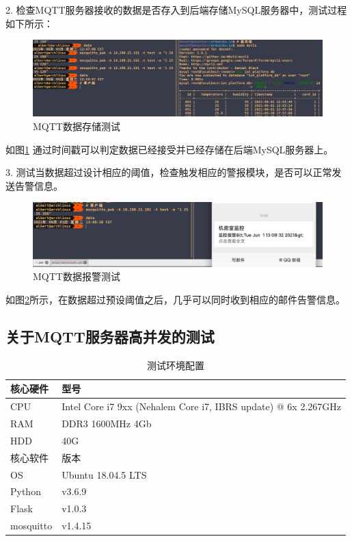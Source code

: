 2. 检查MQTT服务器接收的数据是否存入到后端存储MySQL服务器中，测试过程如下所示：
\begin{figure}[htbp]
	\centering
	\includegraphics[width=0.85\linewidth]{figure/test-2}
	\caption{MQTT数据存储测试}
	\label{fig:6-2}
\end{figure}
如图\ref{fig:6-2} 通过时间戳可以判定数据已经接受并已经存储在后端MySQL服务器上。

3. 测试当数据超过设计相应的阈值，检查触发相应的警报模块，是否可以正常发送告警信息。
\begin{figure}[htbp]
	\centering
	\includegraphics[width=0.85\linewidth]{figure/test-3}
	\caption{MQTT数据报警测试}
	\label{fig:6-3}
\end{figure}
如图\ref{fig:6-3}所示，在数据超过预设阈值之后，几乎可以同时收到相应的邮件告警信息。

\subsection{关于MQTT服务器高并发的测试}

\begin{table}[H]
	\centering
	\caption{测试环境配置}  %
	\begin{tabular}{ll} 
		\hline
		\hline
		核心硬件 & 型号 \\ 
		\hline
		CPU	& Intel Core i7 9xx (Nehalem Core i7, IBRS update) @ 6x 2.267GHz		\\
		RAM	& DDR3 1600MHz 4Gb \\
		HDD	& 40G \\
		\hline
		\hline
		核心软件 & 版本 \\ 
		\hline
		OS	& Ubuntu 18.04.5 LTS \\
		Python & v3.6.9 \\
		Flask & v1.0.3 \\
		mosquitto & v1.4.15 \\
		\hline
	\end{tabular}
\end{table}

